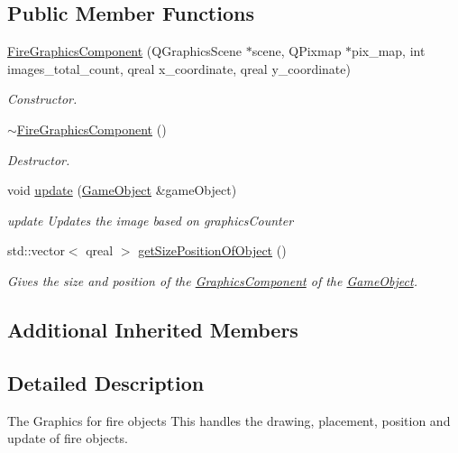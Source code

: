 \subsection*{Public Member Functions}
\begin{DoxyCompactItemize}
\item 
\hyperlink{classFireGraphicsComponent_a29253e498de59832c1cc2bd2f9bb11cc}{Fire\-Graphics\-Component} (Q\-Graphics\-Scene $\ast$scene, Q\-Pixmap $\ast$pix\-\_\-map, int images\-\_\-total\-\_\-count, qreal x\-\_\-coordinate, qreal y\-\_\-coordinate)
\begin{DoxyCompactList}\small\item\em Constructor. \end{DoxyCompactList}\item 
\hypertarget{classFireGraphicsComponent_a325c4a94a0208b9e640146f7a5dc68d0}{\hyperlink{classFireGraphicsComponent_a325c4a94a0208b9e640146f7a5dc68d0}{$\sim$\-Fire\-Graphics\-Component} ()}\label{classFireGraphicsComponent_a325c4a94a0208b9e640146f7a5dc68d0}

\begin{DoxyCompactList}\small\item\em Destructor. \end{DoxyCompactList}\item 
void \hyperlink{classFireGraphicsComponent_a241b7300febe73c29791803784d65c4a}{update} (\hyperlink{classGameObject}{Game\-Object} \&game\-Object)
\begin{DoxyCompactList}\small\item\em update Updates the image based on graphics\-Counter \end{DoxyCompactList}\item 
std\-::vector$<$ qreal $>$ \hyperlink{classFireGraphicsComponent_a61a1db833ae5aff3a0b4464d3a7d9761}{get\-Size\-Position\-Of\-Object} ()
\begin{DoxyCompactList}\small\item\em Gives the size and position of the \hyperlink{classGraphicsComponent}{Graphics\-Component} of the \hyperlink{classGameObject}{Game\-Object}. \end{DoxyCompactList}\end{DoxyCompactItemize}
\subsection*{Additional Inherited Members}


\subsection{Detailed Description}
The Graphics for fire objects This handles the drawing, placement, position and update of fire objects. 

